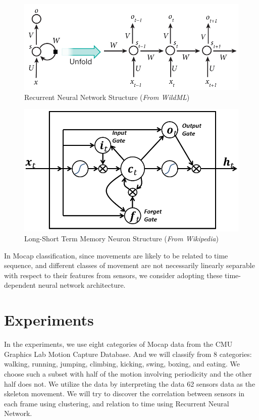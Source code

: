 \documentclass[letterpaper, 10pt, conference]{ieeeconf}
\begin{document}
\begin{figure}[h!]
	\centering
    \includegraphics[scale=0.3]{rnn-struct.jpg}
    \caption{Recurrent Neural Network Structure (\textit{From WildML})}
    \label{fig:rnn-struct}
\end{figure}

\begin{figure}[h!]
	\centering
    \includegraphics[scale=0.3]{lstm-struct.png}
    \caption{Long-Short Term Memory Neuron Structure (\textit{From Wikipedia})}
    \label{fig:lstm-struct}
\end{figure}

In Mocap classification, since movements are likely to be related to time sequence, and different classes of movement are not necessarily linearly separable with respect to their features from sensors, we consider adopting these time-dependent neural network architecture. \\

\section{Experiments}

In the experiments, we use eight categories of Mocap data from the CMU Graphics Lab Motion Capture Database. And we will classify from 8 categories: walking, running, jumping, climbing, kicking, swing, boxing, and eating. We choose such a subset with half of the motion involving periodicity and the other half does not. We utilize the data by interpreting the data 62 sensors data as the skeleton movement. We will try to discover the correlation between sensors in each frame using clustering, and relation to time using Recurrent Neural Network. 
\end{document}
